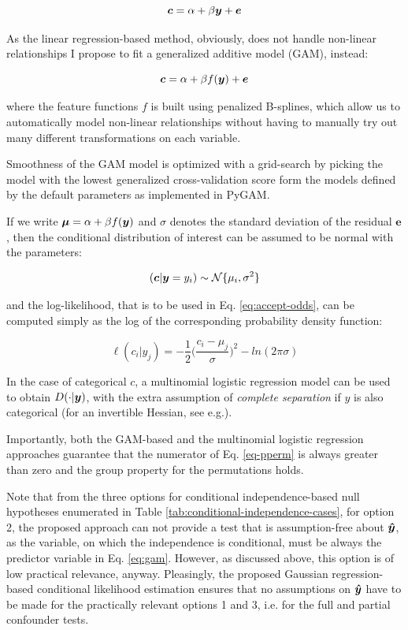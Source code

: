 \documentclass{article}
\begin{document}
\begin{equation}
    \label{eq:linreg}
    \boldsymbol{c} = \alpha + \beta \boldsymbol{y} + \boldsymbol{e}
\end{equation}

As the linear regression-based method, obviously, does not handle non-linear relationships I propose to fit a generalized additive model (GAM)\citep{hastie1987generalized}, instead:

\begin{equation}
    \label{eq:gam}
    \boldsymbol{c} = \alpha + \beta f(\boldsymbol{y}) + \boldsymbol{e}
\end{equation}

where the feature functions $f$ is built using penalized B-splines, which allow us to automatically model non-linear relationships without having to manually try out many different transformations on each variable.

Smoothness of the GAM model is optimized with a grid-search by picking the model with the lowest generalized cross-validation score form the models defined by the default parameters as implemented in PyGAM\citep{serven2018generalized}.

If we write $\boldsymbol{\mu} = \alpha + \beta f(\boldsymbol{y})$ and $\sigma$ denotes the standard deviation of the residual $\boldsymbol{e}$, then the conditional distribution of interest can be assumed to be normal with the parameters:

$$ (\boldsymbol{c}|\boldsymbol{y}=y_i) \sim \mathcal{N}\{\mu_i, \sigma^2\}$$

and the log-likelihood, that is to be used in Eq. \ref{eq:accept-odds}, can be computed simply as the log of the corresponding probability density function:

$$ \ell(c_i|y_j) = - \frac{1}{2} \Big(\frac{c_i-\mu_j}{\sigma}\Big)^2 - ln(2 \pi \sigma)   $$

In the case of categorical $c$, a multinomial logistic regression model can be used to obtain $D(\cdot|\boldsymbol{y})$, with the extra assumption of \emph{complete separation} if $y$ is also categorical (for an invertible Hessian, see e.g.\citep{bennett1966multiple, jones1975proability}).

Importantly, both the GAM-based and the multinomial logistic regression approaches guarantee that the numerator of Eq. \ref{eq-pperm} is always greater than zero and the group property for the permutations holds.

Note that from the three options for conditional independence-based null hypotheses enumerated in Table \ref{tab:conditional-independence-cases}, for option 2, the proposed approach can not provide a test that is assumption-free about $\boldsymbol{\hat{y}}$, as the variable, on which the independence is conditional, must be always the predictor variable in Eq. \ref{eq:gam}. However, as discussed above, this option is of low practical relevance, anyway.
Pleasingly,  the proposed Gaussian regression-based conditional likelihood estimation ensures that no assumptions on $\boldsymbol{\hat{y}}$ have to be made for the practically relevant options 1 and 3, i.e. for the full and partial confounder tests.
\end{document}
